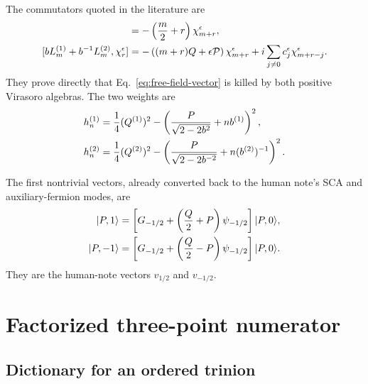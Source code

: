 \documentclass[11pt]{article}
\begin{document}
The commutators quoted in the literature are
\begin{align}
 [L_m^{(1)}+L_m^{(2)},\chi_r^\epsilon]
 &=-\left(\frac m2+r\right)\chi_{m+r}^\epsilon,
 \notag\\
 [bL_m^{(1)}+b^{-1}L_m^{(2)},\chi_r^\epsilon]
 &=-\left((m+r)Q+\epsilon\mathcal P\right)
      \chi_{m+r}^\epsilon
   +i\sum_{j\ne0}c_j^\epsilon\chi_{m+r-j}^\epsilon.
 \label{eq:chi-commutators}
\end{align}
They prove directly that Eq.~\eqref{eq:free-field-vector} is killed by both
positive Virasoro algebras.  The two weights are
\begin{align}
 h_n^{(1)}
 &=\frac14(Q^{(1)})^2
  -\left(\frac{P}{\sqrt{2-2b^2}}+nb^{(1)}\right)^2,
 \notag\\
 h_n^{(2)}
 &=\frac14(Q^{(2)})^2
  -\left(\frac{P}{\sqrt{2-2b^{-2}}}+n(b^{(2)})^{-1}\right)^2.
 \label{eq:branch-weights}
\end{align}

The first nontrivial vectors, already converted back to the human note's SCA
and auxiliary-fermion modes, are
\begin{align}
 |P,1\rangle
 &=\left[G_{-1/2}+\left(\frac Q2+P\right)\psi_{-1/2}\right]|P,0\rangle,
 \notag\\
 |P,-1\rangle
 &=\left[G_{-1/2}+\left(\frac Q2-P\right)\psi_{-1/2}\right]|P,0\rangle.
 \label{eq:k-one-vectors}
\end{align}
They are the human-note vectors \(v_{1/2}\) and \(v_{-1/2}\).

\section{Factorized three-point numerator}

\subsection{Dictionary for an ordered trinion}
\end{document}
